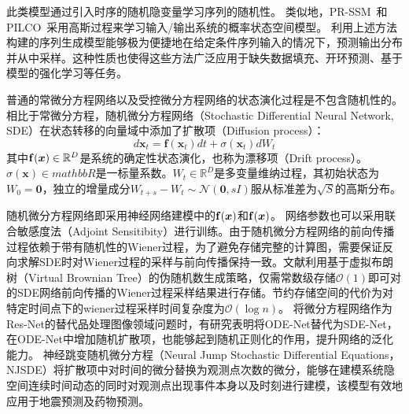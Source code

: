 此类模型通过引入时序的随机隐变量学习序列的随机性。
类似地，PR-SSM~\cite{doerr2018probabilistic}和PILCO~\cite{deisenroth2011pilco}采用高斯过程来学习输入/输出系统的概率状态空间模型。
利用上述方法构建的序列生成模型能够极为便捷地在给定条件序列输入的情况下，预测输出分布并从中采样。这种性质也使得这些方法广泛应用于缺失数据填充\cite{Fraccaro2017}、开环预测\cite{Hafner2019}、基于模型的强化学习等任务\cite{Hafner2019}。

普通的常微分方程网络以及受控微分方程网络的状态演化过程是不包含随机性的。
相比于常微分方程，随机微分方程网络（Stochastic Differential Neural Network, SDE）在状态转移的向量域中添加了扩散项（Diffusion process）：
\begin{equation}
    d \mathbf{x}_t=\mathbf{f}\left(\mathbf{x}_t\right) d t+\sigma\left(\mathbf{x}_t\right) d W_t
    \label{equ:sde}
\end{equation}
其中$\mathbf{f}(\boldsymbol x)\in \mathbb{R}^D$是系统的确定性状态演化，也称为漂移项（Drift process）。$\sigma(\mathbf x)\in mathbb{R}$是一标量系数。$W_t \in \mathbb{R}^D$是多变量维纳过程，其初始状态为$W_0 =\mathbf{0}$，独立的增量成分$W_{t+s}-W_t \sim \mathcal{N}(\mathbf{0}, s I)$服从标准差为$\sqrt{S}$的高斯分布。

随机微分方程网络即采用神经网络建模中的$\mathbf{f}(\boldsymbol x)$和$\mathbf{f}(\boldsymbol x)$。
网络参数也可以采用联合敏感度法（Adjoint Sensitibity）进行训练\cite{li2020scalable}。由于随机微分方程网络的前向传播过程依赖于带有随机性的Wiener过程，为了避免存储完整的计算图，需要保证反向求解SDE时对Wiener过程的采样与前向传播保持一致。文献\cite{li2020scalable}利用基于虚拟布朗树（Virtual Brownian Tree）的伪随机数生成策略，仅需常数级存储$\mathcal{O}(1)$即可对的SDE网络前向传播的Wiener过程采样结果进行存储。节约存储空间的代价为对特定时间点下的wiener过程采样时间复杂度为$\mathcal{O}(\log n)$。
将微分方程网络作为Res-Net的替代品处理图像领域问题时，有研究表明将ODE-Net替代为SDE-Net，在ODE-Net中增加随机扩散项，也能够起到随机正则化的作用，提升网络的泛化能力\cite{Oganesyan2020}。
神经跳变随机微分方程（Neural Jump Stochastic Differential Equations，NJSDE）\cite{Jia2019}将扩散项中对时间的微分替换为观测点次数的微分，能够在建模系统隐空间连续时间动态的同时对观测点出现事件本身以及时刻进行建模，该模型有效地应用于地震预测及药物预测。



